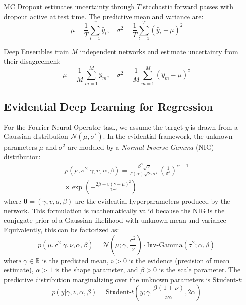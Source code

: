 MC Dropout \cite{gal2016dropout} estimates uncertainty through $T$ stochastic forward passes with dropout active at test time. The predictive mean and variance are:
\begin{equation}
    \mu = \frac{1}{T}\sum_{t=1}^{T} \hat{y}_t, \quad \sigma^2 = \frac{1}{T}\sum_{t=1}^{T} (\hat{y}_t - \mu)^2
\end{equation}

Deep Ensembles \cite{lakshminarayanan2017simple} train $M$ independent networks and estimate uncertainty from their disagreement:
\begin{equation}
    \mu = \frac{1}{M}\sum_{m=1}^{M} \hat{y}_m, \quad \sigma^2 = \frac{1}{M}\sum_{m=1}^{M} (\hat{y}_m - \mu)^2
\end{equation}

\subsection{Evidential Deep Learning for Regression}

For the Fourier Neural Operator task, we assume the target $y$ is drawn from a Gaussian distribution
$\mathcal{N}(\mu, \sigma^2)$. In the evidential framework, the unknown parameters $\mu$ and $\sigma^2$ are modeled
by a \textit{Normal-Inverse-Gamma} (NIG) distribution:
\begin{multline}
    p(\mu, \sigma^2 | \gamma, v, \alpha, \beta) = \frac{\beta^\alpha \sqrt{v}}{\Gamma(\alpha) \sqrt{2\pi\sigma^2}} \left(\frac{1}{\sigma^2}\right)^{\alpha+1} \\
    \times \exp\left( -\frac{2\beta + v(\gamma - \mu)^2}{2\sigma^2} \right)
\end{multline}
where $\boldsymbol{\theta} = (\gamma, v, \alpha, \beta)$ are the evidential hyperparameters produced by the network. This formulation is mathematically valid because the NIG is the conjugate prior of a Gaussian likelihood with unknown mean and variance. Equivalently, this can be factorized as:
\begin{equation}
    p(\mu, \sigma^2 | \gamma, \nu, \alpha, \beta) = \mathcal{N}\left(\mu; \gamma, \frac{\sigma^2}{\nu}\right) \cdot \text{Inv-Gamma}(\sigma^2; \alpha, \beta)
\end{equation}
where $\gamma \in \mathbb{R}$ is the predicted mean, $\nu > 0$ is the evidence (precision of mean estimate), $\alpha > 1$ is the shape parameter, and $\beta > 0$ is the scale parameter. The predictive distribution marginalizing over the unknown parameters is Student-$t$:
\begin{equation}
    p(y | \gamma, \nu, \alpha, \beta) = \text{Student-}t\left(y; \gamma, \frac{\beta(1+\nu)}{\nu \alpha}, 2\alpha\right)
\end{equation}

